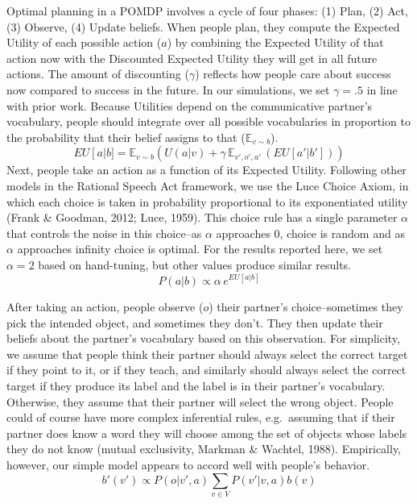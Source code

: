 \documentclass[english,,man,floatsintext]{apa6}
\begin{document}
Optimal planning in a POMDP involves a cycle of four phases: (1) Plan, (2) Act, (3) Observe, (4) Update beliefs. When people plan, they compute the Expected Utility of each possible action (\(a\)) by combining the Expected Utility of that action now with the Discounted Expected Utility they will get in all future actions. The amount of discounting (\(\gamma\)) reflects how people care about success now compared to success in the future. In our simulations, we set \(\gamma=.5\) in line with prior work. Because Utilities depend on the communicative partner's vocabulary, people should integrate over all possible vocabularies in proportion to the probability that their belief assigns to that (\(\mathbb{E}_{v \sim b}\)).
\[
EU\left[a\right | b] = \mathbb{E}_{v \sim b} \left(U(a|v) + \gamma \,\mathbb{E}_{v',o',a'} \,\left( EU\left[a' | b'\right]\right)\right)
\]
Next, people take an action as a function of its Expected Utility. Following other models in the Rational Speech Act framework, we use the Luce Choice Axiom, in which each choice is taken in probability proportional to its exponentiated utility (Frank \& Goodman, 2012; Luce, 1959). This choice rule has a single parameter \(\alpha\) that controls the noise in this choice--as \(\alpha\) approaches 0, choice is random and as \(\alpha\) approaches infinity choice is optimal. For the results reported here, we set \(\alpha = 2\) based on hand-tuning, but other values produce similar results.
\[
P\left(a|b\right) \propto \alpha \, e^{EU[a|b]}
\]

After taking an action, people observe (\(o\)) their partner's choice--sometimes they pick the intended object, and sometimes they don't. They then update their beliefs about the partner's vocabulary based on this observation. For simplicity, we assume that people think their partner should always select the correct target if they point to it, or if they teach, and similarly should always select the correct target if they produce its label and the label is in their partner's vocabulary. Otherwise, they assume that their partner will select the wrong object. People could of course have more complex inferential rules, e.g.~assuming that if their partner does know a word they will choose among the set of objects whose labels they do not know (mutual exclusivity, Markman \& Wachtel, 1988). Empirically, however, our simple model appears to accord well with people's behavior.
\[
b'(v') \propto P\left(o|v',a\right) \sum_{v \in V}P\left(v'|v,a\right)b\left(v\right)
\]
\end{document}
